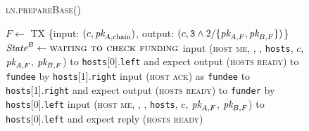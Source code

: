 \begin{figure}[H]
  \begin{processbox}{\textsc{ln.prepareBase}()}
    \begin{algorithmic}[1]
       
        \State $F \gets$ TX \{input: $(c, \textit{pk}_{A, \mathrm{chain}})$, output: $(c,
        \texttt{3} \wedge 2/\{\textit{pk}_{A, F}, \textit{pk}_{B, F}\})$\}
        \label{code:ln:base:create-funding}
          \State $\textit{State}^B \gets \textsc{waiting to check funding}$
        \EndIf
      \Else \: 
          \State input (\textsc{host me}, \alice, \bob, \texttt{hosts}, $c$,
          $\textit{pk}_{A, F}$, $\textit{pk}_{B, F}$) to \texttt{hosts}[0].\texttt{left} and
          expect output (\textsc{hosts ready}) to \texttt{fundee} by
          \texttt{hosts}[1].\texttt{right} 
          \State input (\textsc{host ack}) as \texttt{fundee} to
          \texttt{hosts}[1].\texttt{right} and expect output (\textsc{hosts
          ready}) to \texttt{funder} by \texttt{hosts}[0].\texttt{left}
        \Else \: 
          \State input (\textsc{host me}, \alice, \bob, \texttt{hosts}, $c$,
          $\textit{pk}_{A, F}$, $\textit{pk}_{B, F}$) to \texttt{hosts}[0].\texttt{left} and expect
          reply (\textsc{hosts ready}) 
        \EndIf
      \EndIf
    \end{algorithmic}
  \end{processbox}
  \caption{}
  \label{code:ln:prepare-base}
\end{figure}

